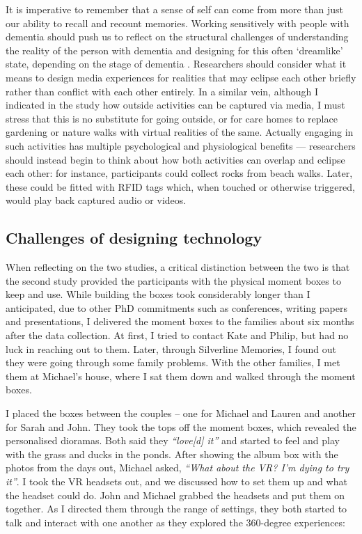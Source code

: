 It is imperative to remember that a sense of self can come from more than just our ability to recall and recount memories. Working sensitively with people with dementia should push us to reflect on the structural challenges of understanding the reality of the person with dementia and designing for this often `dreamlike' state, depending on the stage of dementia \citep{bryden_before_2015}. Researchers should consider what it means to design media experiences for realities that may eclipse each other briefly rather than conflict with each other entirely. In a similar vein, although I indicated in the study how outside activities can be captured via media, I must stress that this is no substitute for going outside, or for care homes to replace gardening or nature walks with virtual realities of the same. Actually engaging in such activities has multiple psychological and physiological benefits \citep{gilliard_transforming_2011} — researchers should instead begin to think about how both activities can overlap and eclipse each other: for instance, participants could collect rocks from beach walks. Later, these could be fitted with RFID tags which, when touched or otherwise triggered, would play back captured audio or videos.

\subsection{Challenges of designing technology}
\label{robust-tech}
When reflecting on the two studies, a critical distinction between the two is that the second study provided the participants with the physical moment boxes to keep and use. While building the boxes took considerably longer than I anticipated, due to other PhD commitments such as conferences, writing papers and presentations, I delivered the moment boxes to the families about six months after the data collection. At first, I tried to contact Kate and Philip, but had no luck in reaching out to them. Later, through Silverline Memories, I found out they were going through some family problems. With the other families, I met them at Michael's house, where I sat them down and walked through the moment boxes.

I placed the boxes between the couples – one for Michael and Lauren and another for Sarah and John. They took the tops off the moment boxes, which revealed the personalised dioramas. Both said they \textit{``love[d] it''} and started to feel and play with the grass and ducks in the ponds. After showing the album box with the photos from the days out, Michael asked, \textit{``What about the VR? I'm dying to try it''}. I took the VR headsets out, and we discussed how to set them up and what the headset could do. John and Michael grabbed the headsets and put them on together. As I directed them through the range of settings, they both started to talk and interact with one another as they explored the 360-degree experiences:

